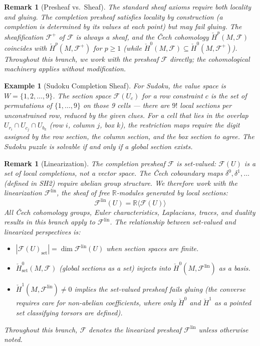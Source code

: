 \documentclass[11pt,letterpaper]{article}
\newtheorem{example}[conjecture]{Example}
\newtheorem{remark}[conjecture]{Remark}
\newcommand{\Hcech}{\check{H}}
\newcommand{\sheaf}{\mathcal{F}}
\begin{document}
\begin{remark}[Presheaf vs.\ Sheaf]\label{rem:presheaf}
The standard sheaf axioms require both locality and gluing. The 
completion presheaf satisfies locality by construction (a completion 
is determined by its values at each point) but may fail gluing. The 
\emph{sheafification} $\sheaf^+$ of $\sheaf$ is always a sheaf, and 
the \v{C}ech cohomology $\Hcech^p(M, \sheaf)$ coincides with 
$\Hcech^p(M, \sheaf^+)$ for $p \geq 1$ (while $\Hcech^0(M, \sheaf) 
\subseteq \Hcech^0(M, \sheaf^+)$). Throughout this branch, we work 
with the presheaf $\sheaf$ directly; the cohomological machinery 
applies without modification.
\end{remark}

\begin{example}[Sudoku Completion Sheaf]
For Sudoku, the value space is $W = \{1, 2, \ldots, 9\}$. The section 
space $\sheaf(U_c)$ for a row constraint $c$ is the set of permutations 
of $\{1, \ldots, 9\}$ on those 9 cells --- there are $9!$ local 
sections per unconstrained row, reduced by the given clues. For a cell 
that lies in the overlap $U_{r_i} \cap U_{c_j} \cap U_{b_k}$ (row $i$, 
column $j$, box $k$), the restriction maps require the digit assigned 
by the row section, the column section, and the box section to agree. 
The Sudoku puzzle is solvable if and only if a global section exists.
\end{example}

\begin{remark}[Linearization]\label{rem:linearization}
The completion presheaf $\sheaf$ is \emph{set-valued}: $\sheaf(U)$ is 
a set of local completions, not a vector space. The \v{C}ech coboundary 
maps $\delta^0, \delta^1, \ldots$ (defined in SH2) require abelian 
group structure. We therefore work with the \emph{linearization} 
$\sheaf^{\mathrm{lin}}$, the sheaf of free $\mathbb{R}$-modules 
generated by local sections:
\[
    \sheaf^{\mathrm{lin}}(U) = \mathbb{R}\langle \sheaf(U) \rangle
\]
All \v{C}ech cohomology groups, Euler characteristics, Laplacians, 
traces, and duality results in this branch apply to 
$\sheaf^{\mathrm{lin}}$. The relationship between set-valued and 
linearized perspectives is:
\begin{itemize}
    \item $|\sheaf(U)_{\mathrm{set}}| = \dim \sheaf^{\mathrm{lin}}(U)$ 
    when section spaces are finite.
    \item $\Hcech^0_{\mathrm{set}}(M, \sheaf)$ (global sections as a 
    set) injects into $\Hcech^0(M, \sheaf^{\mathrm{lin}})$ as a basis.
    \item $\Hcech^1(M, \sheaf^{\mathrm{lin}}) \neq 0$ implies the 
    set-valued presheaf fails gluing (the converse requires care for 
    non-abelian coefficients, where only $\Hcech^0$ and $\Hcech^1$ as 
    a pointed set classifying torsors are defined).
\end{itemize}
Throughout this branch, $\sheaf$ denotes the linearized presheaf 
$\sheaf^{\mathrm{lin}}$ unless otherwise noted.
\end{remark}
\end{document}
